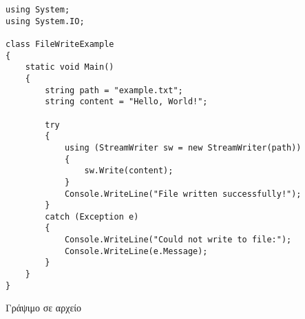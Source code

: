 \begin{listing}[htbp]    
\begin{verbatim}
using System;
using System.IO;

class FileWriteExample
{
    static void Main()
    {
        string path = "example.txt";
        string content = "Hello, World!";

        try
        {
            using (StreamWriter sw = new StreamWriter(path))
            {
                sw.Write(content);
            }
            Console.WriteLine("File written successfully!");
        } 
        catch (Exception e)
        {
            Console.WriteLine("Could not write to file:");
            Console.WriteLine(e.Message);
        }
    }
}
\end{verbatim}
\caption{Γράψιμο σε αρχείο}
\label{WriteFile}
\end{listing}
